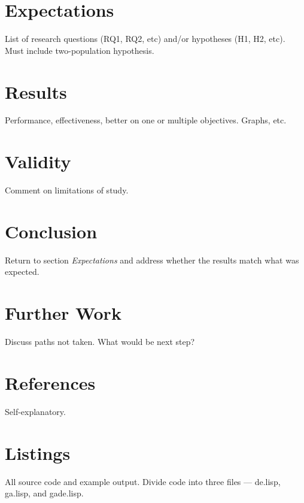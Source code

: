 \documentclass{sig-alternate}
\begin{document}
\section{Expectations}
List of research questions (RQ1, RQ2, etc) and/or hypotheses
(H1, H2, etc).  Must include two-population hypothesis.

\section{Results}
Performance, effectiveness, better on one or multiple
objectives.  Graphs, etc.

\section{Validity}
Comment on limitations of study.

\section{Conclusion}
Return to section \emph{Expectations} and address whether the results
match what was expected.

\section{Further Work}
Discuss paths not taken.  What would be next step?

\section{References}
Self-explanatory.

\section{Listings}
All source code and example output.  Divide code into three files
--- de.lisp, ga.lisp, and gade.lisp.
\end{document}
